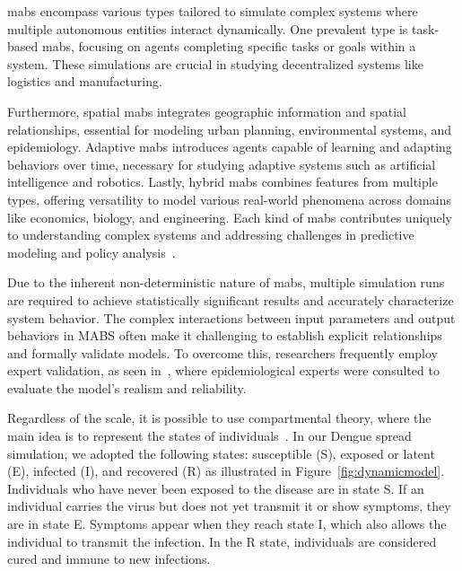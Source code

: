 \gls{mabs} encompass various types tailored to simulate complex systems where
multiple autonomous entities interact dynamically. One prevalent type is
task-based \gls{mabs}, focusing on agents completing specific tasks or goals
within a system. These simulations are crucial in studying decentralized systems
like logistics and manufacturing.

Furthermore, spatial \gls{mabs} integrates geographic information and spatial
relationships, essential for modeling urban planning, environmental systems, and
epidemiology. Adaptive \gls{mabs} introduces agents capable of learning and
adapting behaviors over time, necessary for studying adaptive systems such as
artificial intelligence and robotics. Lastly, hybrid \gls{mabs} combines
features from multiple types, offering versatility to model various real-world
phenomena across domains like economics, biology, and engineering. Each kind of
\gls{mabs} contributes uniquely to understanding complex systems and addressing
challenges in predictive modeling and policy analysis~\citep{Bonabeau:2002}.

Due to the inherent non-deterministic nature of \gls{mabs}, multiple simulation
runs are required to achieve statistically significant results and accurately
characterize system behavior. The complex interactions between input parameters
and output behaviors in MABS often make it challenging to establish explicit
relationships and formally validate models. To overcome this, researchers
frequently employ expert validation, as seen in~\citet{amouroux:2008,
	damien:2017}, where epidemiological experts were consulted to evaluate the
model's realism and reliability.

Regardless of the scale, it is possible to use compartmental theory, where the
main idea is to represent the states of individuals~\citep{brauer-2008}. In our
Dengue spread simulation, we adopted the following states: susceptible (S),
exposed or latent (E), infected (I), and recovered (R) as illustrated in
Figure~\ref{fig:dynamicmodel}. Individuals who have never been exposed to the
disease are in state S. If an individual carries the virus but does not yet
transmit it or show symptoms, they are in state E. Symptoms appear when they
reach state I, which also allows the individual to transmit the infection. In
the R state, individuals are considered cured and immune to new infections.

